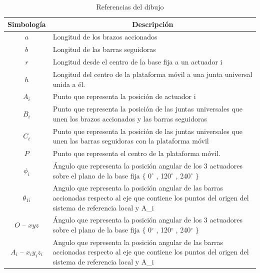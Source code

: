         \begingroup
            \renewcommand{\arraystretch}{1.5}
            \begin{table}[H]
            \centering
            \begin{tabular}{c m{12cm}}
               \hline
               \textbf{Simbología}  & \multicolumn{1}{c}{\textbf{Descripción}}  \\
               \hline           \hline            
             $a$ & Longitud de los brazos accionados \\
            \hline
             $b$ & Longitud de las barras seguidoras \\
            \hline
             $r$ & Longitud desde el centro de la base fija a un actuador i \\
            \hline
             $h$ & Longitud del centro de la plataforma móvil a una junta universal unida a él.\\
            \hline
             $A_{i}$ & Punto que representa la posición de actuador i \\
            \hline
             $ B_{i}$ & Punto que representa la posición de las juntas universales que unen los brazos accionados y las barras seguidoras \\
            \hline
             $C_{i}$ & Punto que representa la posición de las juntas universales que unen las barras seguidoras con la plataforma móvil \\
            \hline
             $P$ & Punto que representa el centro de la plataforma móvil.\\
            \hline
             $\phi _{i}$ & Ángulo que representa la posición angular de los 3 actuadores sobre el plano de la base fija $ \{ $ 0$ ^{\circ} $ , 120$ ^{\circ} $ , 240$ ^{\circ} $ $ \} $ \\
            \hline
             $ \theta _{1i}$ & Angulo que representa la posición angular de las barras accionadas respecto al eje que contiene los puntos del origen del sistema de referencia local y A_{i}  \\
            \hline
             $O$ – $xyz$ & Ángulo que representa la posición angular de los 3 actuadores sobre el plano de la base fija $ \{ $ 0$ ^{\circ} $ , 120$ ^{\circ} $ , 240$ ^{\circ} $ $ \} $ \\
            \hline
             $  A_{i}$ – $x_{i}y_{i}z_{i}$ & Angulo que representa la posición angular de las barras accionadas respecto al eje que contiene los puntos del origen del sistema de referencia local y A_{i}  \\
            \hline
            \end{tabular}
            \caption{Referencias del dibujo}
           \label{tab:cap4_tabla_6}
        \end{table}
        \endgroup        
        
